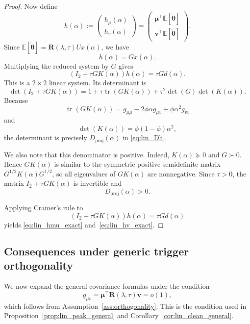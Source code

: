 \documentclass[11pt]{article}
\DeclareMathOperator{\tr}{tr}
\newcommand{\EE}{\mathbb{E}}
\newcommand{\bv}{\mathbf{v}}
\newcommand{\bmu}{\boldsymbol{\mu}}
\newcommand{\btheta}{\boldsymbol{\theta}}
\begin{document}
\begin{proof}
Now define
\[
h(\alpha):=
\begin{pmatrix}
h_\mu(\alpha)\\
h_v(\alpha)
\end{pmatrix}
=
\begin{pmatrix}
\bmu^\top\EE[\tilde{\btheta}]\\
\bv^\top\EE[\tilde{\btheta}]
\end{pmatrix}.
\]
Since \(\EE[\tilde{\btheta}]=\mathbf{R}(\lambda,\tau)Ux(\alpha)\), we have
\[
h(\alpha)=Gx(\alpha).
\]
Multiplying the reduced system by \(G\) gives
\[
(I_2+\tau G K(\alpha))h(\alpha)
=
\tau Gd(\alpha).
\]
This is a \(2\times2\) linear system. Its determinant is
\[
\det(I_2+\tau G K(\alpha))
=
1+\tau\tr(GK(\alpha))+\tau^2\det(G)\det(K(\alpha)).
\]
Because
\[
\tr(GK(\alpha))
=
g_{\mu\mu}-2\phi\alpha g_{\mu v}+\phi\alpha^2g_{vv}
\]
and
\[
\det(K(\alpha))=\phi(1-\phi)\alpha^2,
\]
the determinant is precisely \(D_{\mathrm{proj}}(\alpha)\) in
\eqref{eq:lin_Dh}.

We also note that this denominator is positive. Indeed, \(K(\alpha)\succeq0\)
and \(G\succ0\). Hence \(G K(\alpha)\) is similar to the symmetric positive
semidefinite matrix \(G^{1/2}K(\alpha)G^{1/2}\), so all eigenvalues of
\(G K(\alpha)\) are nonnegative. Since \(\tau>0\), the matrix
\(I_2+\tau G K(\alpha)\) is invertible and
\[
D_{\mathrm{proj}}(\alpha)>0 .
\]

Applying Cramer's rule to
\[
(I_2+\tau G K(\alpha))h(\alpha)
=
\tau Gd(\alpha)
\]
yields \eqref{eq:lin_hmu_exact} and~\eqref{eq:lin_hv_exact}.
\end{proof}









\subsection{Consequences under generic trigger orthogonality}

We now expand the general-covariance formulas under the condition
\[
g_{\mu v}=\bmu^\top \mathbf{R}(\lambda,\tau)\bv=o(1),
\]
which follows from Assumption~\ref{ass:orthogonality}. This is the condition
used in Proposition~\ref{prop:lin_peak_general} and
Corollary~\ref{cor:lin_clean_general}.
\end{document}
